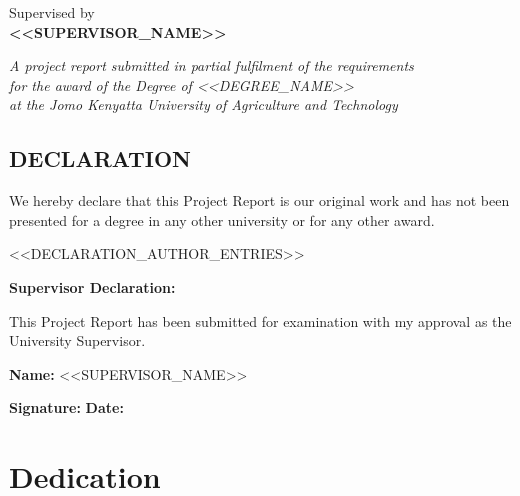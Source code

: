 \documentclass[12pt, a4paper]{report}
\begin{document}
\begin{titlepage}
\begin{center}
{\normalsize Supervised by}\\[0.2cm]
{\large \textbf{<<SUPERVISOR_NAME>>}}

\vfill

{\footnotesize \textit{A project report submitted in partial fulfilment of the requirements}}\\
{\footnotesize \textit{for the award of the Degree of <<DEGREE_NAME>>}}\\
{\footnotesize \textit{at the Jomo Kenyatta University of Agriculture and Technology}}\\



\end{center}
\end{titlepage}
\hypersetup{pageanchor=true}



\section*{DECLARATION}

We hereby declare that this Project Report is our original work and has not been presented for a degree in any other university or for any other award.

<<DECLARATION_AUTHOR_ENTRIES>>

\vspace{1cm}
\noindent
\textbf{Supervisor Declaration:}

\noindent
This Project Report has been submitted for examination with my approval as the University Supervisor.

\vspace{1cm}

\noindent
\textbf{Name:} <<SUPERVISOR_NAME>>
\vspace{1cm}

\noindent
\textbf{Signature:} \underline{\hspace{5cm}} \hfill \textbf{Date:} \underline{\hspace{4cm}}

\newpage

\chapter*{Dedication}
\end{document}
